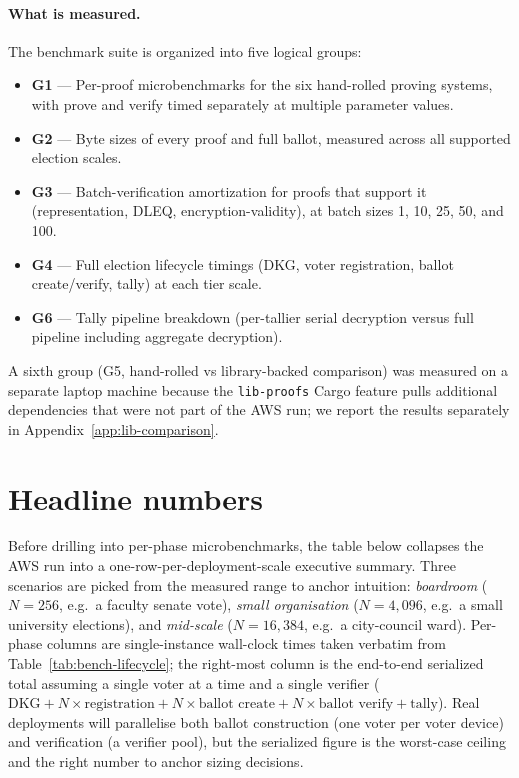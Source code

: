 \documentclass[12pt,a4paper,oneside]{report}
\begin{document}
\paragraph{What is measured.}
The benchmark suite is organized into five logical groups:
\begin{itemize}
\item \textbf{G1} --- Per-proof microbenchmarks for the six hand-rolled 
proving systems, with prove and verify timed separately at multiple 
parameter values.
\item \textbf{G2} --- Byte sizes of every proof and full ballot, measured 
across all supported election scales.
\item \textbf{G3} --- Batch-verification amortization for proofs that 
support it (representation, DLEQ, encryption-validity), at batch sizes 
1, 10, 25, 50, and 100.
\item \textbf{G4} --- Full election lifecycle timings (DKG, voter 
registration, ballot create/verify, tally) at each tier scale.
\item \textbf{G6} --- Tally pipeline breakdown (per-tallier serial 
decryption versus full pipeline including aggregate decryption).
\end{itemize}
A sixth group (G5, hand-rolled vs library-backed comparison) was
measured on a separate laptop machine because the \texttt{lib-proofs}
Cargo feature pulls additional dependencies that were not part of the
AWS run; we report the results separately in
Appendix~\ref{app:lib-comparison}.

\section{Headline numbers}
\label{sec:bench-headline}

Before drilling into per-phase microbenchmarks, the table below
collapses the AWS run into a one-row-per-deployment-scale executive
summary. Three scenarios are picked from the measured range to anchor
intuition: \emph{boardroom} ($N = 256$, e.g.\ a faculty senate vote),
\emph{small organisation} ($N = 4{,}096$, e.g.\ a small university
elections), and \emph{mid-scale} ($N = 16{,}384$, e.g.\ a city-council
ward). Per-phase columns are single-instance wall-clock times taken
verbatim from Table~\ref{tab:bench-lifecycle}; the right-most column
is the end-to-end serialized total assuming a single voter at a time
and a single verifier ($\text{DKG} + N \times \text{registration} +
N \times \text{ballot create} + N \times \text{ballot verify} +
\text{tally}$). Real deployments will parallelise both ballot
construction (one voter per voter device) and verification (a
verifier pool), but the serialized figure is the worst-case ceiling
and the right number to anchor sizing decisions.
\end{document}
